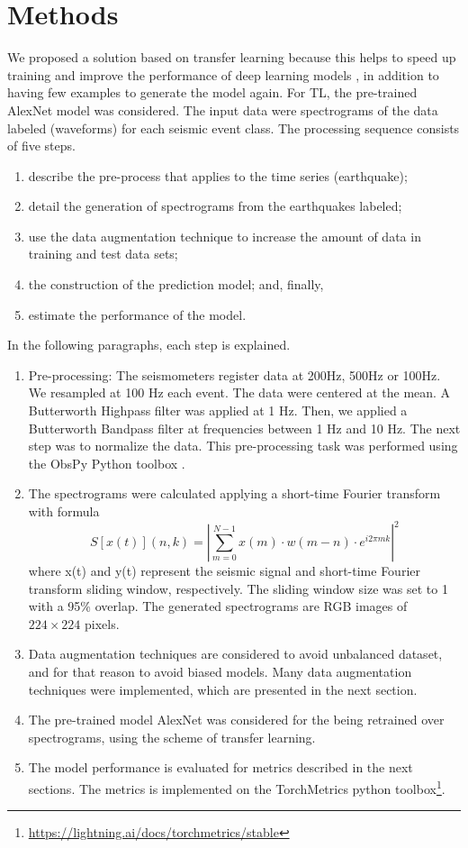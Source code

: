 \documentclass[journal]{IEEEtran}
\begin{document}
\section{Methods} \label{methods}
We proposed a solution based on transfer learning because this helps to speed up training and improve the performance of deep learning models \cite{titos2019classification,bueno2019volcano}, in addition to having few examples to generate the model again. For TL, the pre-trained AlexNet\cite{krizhevsky2012imagenet} model was considered.
The input data were spectrograms of the data labeled (waveforms) for each seismic event class. The processing sequence consists of five steps.
\begin{enumerate}
 \item describe the pre-process that applies to the time series (earthquake);
 \item detail the generation of spectrograms from the earthquakes labeled;
 \item use the data augmentation technique to increase the amount of data in training and test data sets;
 \item the construction of the prediction model; and, finally,
 \item estimate the performance of the model.
\end{enumerate}
In the following paragraphs, each step is explained.
\begin{enumerate}
  \item Pre-processing: The seismometers register data at 200Hz, 500Hz or 100Hz. We resampled at 100 Hz each event. The data were centered at the mean. A Butterworth Highpass filter was applied at 1 Hz. Then, we applied a Butterworth Bandpass filter at frequencies between 1 Hz and 10 Hz. The next step was to normalize the data. This pre-processing task was performed using the ObsPy Python toolbox \cite{beyreuther2010obspy}.
  \item The spectrograms were calculated applying a short-time Fourier transform with formula
$$
S[x(t)](n,k)=\left|\sum_{m=0}^{N-1}x(m)\cdot w(m-n)\cdot e^{i2\pi mk}\right|^2$$
where x(t) and y(t) represent the seismic signal and short-time Fourier transform sliding window, respectively. The sliding window size was set to 1 with a 95\% overlap. The generated spectrograms are RGB images of $224\times224$ pixels.
  \item Data augmentation techniques are considered to avoid unbalanced dataset, and for that reason to avoid biased models. Many data augmentation techniques were implemented, which are presented in the next section.
  \item The pre-trained model AlexNet\cite{krizhevsky2012imagenet} was considered for the being retrained over spectrograms, using the scheme of transfer learning.
  \item The model performance is evaluated for metrics described in the next sections. The metrics is implemented on the TorchMetrics python toolbox\footnote{\href{https://lightning.ai/docs/torchmetrics/stable}{\color{blue}https://lightning.ai/docs/torchmetrics/stable}}.
\end{enumerate}
\end{document}
